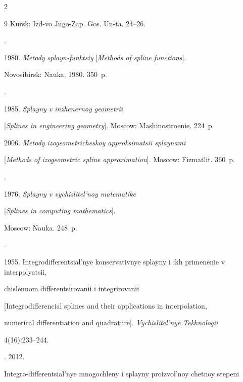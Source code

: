 \begin{multicols}{2}
{{\begin{thebibliography}{9}
Kursk: Izd-vo Jugo-Zap. Gos. Un-ta. 24--26. 







.  


1980. \textit{Metody splayn-funktsiy} [\textit{Methods of spline functions}].


Novosibirsk: Nauka, 1980. 350~p.




.


1985. \textit{Splayny v inzhenernoy geometrii} 


[\textit{Splines in engineering geometry}]. Moscow: Mashinostroenie. 224~p.






2006. \textit{Metody izogeometricheskoy approk\-si\-ma\-tsii splaynami} 


[\textit{Methods of izogeometric spline approximation}].  Moscow: Fizmatlit. 360~p.




.


1976. \textit{Splayny v vychislitel'noy matematike}


[\textit{Splines in computing mathematics}]. 


Moscow: Nauka. 248~p.




.  


1955. Integro\-dif\-fe\-ren\-tsi\-al'nye  konservativnye splayny i ikh primenenie v in\-ter\-po\-lya\-tsii,  


chislennom differentsirovanii i integrirovanii 


[Integrodifferencial splines and their applications in interpolation, 


numerical differentiation and quadrature]. \textit{Vychislitel'nye Tekhnologii}


 4(16):233--244. 




. 2012.


Integro-differentsial'nye mnogochleny i splay\-ny proizvol'noy chetnoy stepeni 



\end{thebibliography}}}
\end{multicols}
